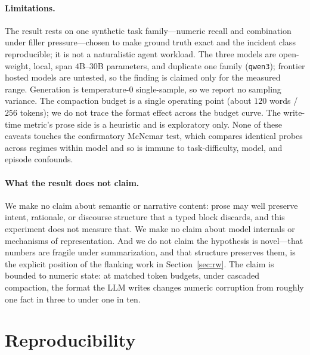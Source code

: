 \documentclass[11pt]{article}
\begin{document}
\paragraph{Limitations.}
The result rests on one synthetic task family---numeric recall and combination
under filler pressure---chosen to make ground truth exact and the incident
class reproducible; it is not a naturalistic agent workload. The three models
are open-weight, local, span $4$B--$30$B parameters, and duplicate one family
(\texttt{qwen3}); frontier hosted models are untested, so the finding is
claimed only for the measured range. Generation is temperature-$0$
single-sample, so we report no
sampling variance. The compaction budget is a single operating point (about
$120$ words / $256$ tokens); we do not trace the format effect across the
budget curve. The write-time metric's prose side is a heuristic and is
exploratory only. None of these caveats touches the confirmatory McNemar test,
which compares identical probes across regimes within model and so is immune to
task-difficulty, model, and episode confounds.

\paragraph{What the result does not claim.}
We make no claim about semantic or narrative content: prose may well preserve
intent, rationale, or discourse structure that a typed block discards, and
this experiment does not measure that. We make no claim about model internals
or mechanisms of representation. And we do not claim the hypothesis is
novel---that numbers are fragile under summarization, and that structure
preserves them, is the explicit position of the flanking work in
Section~\ref{sec:rw}. The claim is bounded to numeric state: at matched token
budgets, under cascaded compaction, the format the LLM writes changes numeric
corruption from roughly one fact in three to under one in ten.

\section{Reproducibility}
\label{sec:repro}
\end{document}
